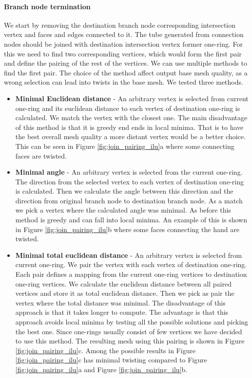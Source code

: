 \paragraph{Branch node termination}
We start by removing the destination branch node corresponding intersection vertex and faces and edges connected to it. The tube generated from connection nodes should be joined with destination intersection vertex former one-ring. For this we need to find two corresponding vertices, which would form the first pair and define the pairing of the rest of the vertices. We can use multiple methods to find the first pair. The choice of the method affect output base mesh quality, as a wrong selection can lead into twists in the base mesh. We tested three methods.
\begin{itemize}
	\itemsep-0.25em 
	\item \textbf{Minimal Euclidean distance} - An arbitrary vertex is selected from current one-ring and its euclidean distance to each vertex of destination one-ring is calculated. We match the vertex with the closest one. The main disadvantage of this method is that it is greedy end ends in local minima. That is to have the best overall mesh quality a more distant vertex would be a better choice. This can be seen in Figure \ref{fig:join_pairing_ilu}a where some connecting faces are twisted.
	\item \textbf{Minimal angle} - An arbitrary vertex is selected from the current one-ring. The direction from the selected vertex to each vertex of destination one-ring is calculated. Then we calculate the angle between this direction and the direction from original branch node to destination branch node. As a match we pick a vertex where the calculated angle was minimal. As before this method is greedy and can fall into local minima. An example of this is shown in Figure \ref{fig:join_pairing_ilu}b where some faces connecting the hand are twisted.
	\item \textbf{Minimal total euclidean distance} - An arbitrary vertex is selected from current one-ring. We pair the vertex with each vertex of destination one-ring. Each pair defines a mapping from the current one-ring vertices to destination one-ring vertices. We calculate the euclidean distance between all paired vertices and store it as total euclidean distance. Then we pick as pair the vertex where the total distance was minimal. The disadvantage of this approach is that it takes longer to compute. The advantage is that this approach avoids local minima by testing all the possible solutions and picking the best one. Since one-rings usually consist of few vertices we have decided to use this method. The resulting mesh using this pairing is shown in Figure \ref{fig:join_pairing_ilu}c. Among the possible results in Figure \ref{fig:join_pairing_ilu}c has minimal twisting compared to Figure \ref{fig:join_pairing_ilu}a and Figure \ref{fig:join_pairing_ilu}b. 
\end{itemize}

